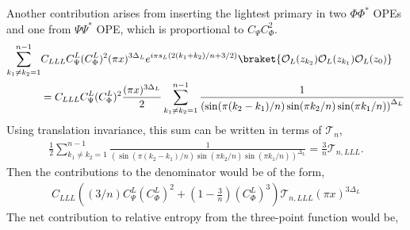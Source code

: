 \documentclass[11pt]{article}
\newcommand{\p}{\partial}
\newcommand{\mO}{\mathcal{O}}
\newcommand{\nn}{\nonumber}
\newcommand{\lb}{\left(}
\newcommand{\rb}{\right)}
\begin{document}
  Another contribution  arises from inserting the lightest primary in two $\Phi \Phi^*$ OPEs and one from $\Psi \Psi^*$ OPE, which is proportional to $C_\Psi C_\Phi^2$. 
    \begin{align}
       \sum_{k_1 \neq k_2 = 1}^{n-1}&C_{LLL}C_{\Psi}^L (C^L_{\Phi})^2(\pi x)^{3\Delta_L} e^{i\pi s_L(2(k_1 + k_2)/n + 3/2) }\braket{ \mO_L(z_{k_2})\mO_L(z_{k_1})\mO_L(z_{0})} \nn \\ 
       & = C_{LLL}C_{\Psi}^L (C^L_{\Phi})^2\frac{(\pi x)^{3\Delta_L}}{2}\sum_{k_1 \neq k_2 = 1}^{n-1}\frac{1}{\lb \sin(\pi (k_2 - k_1)/n) \sin (\pi k_2/n) \sin(\pi k_1/n)\rb^{\Delta_L}}
  \end{align}
Using translation invariance, this sum can be written in terms of $\mathcal{T}_n$,
\begin{align}
    \frac{1}{2}\sum_{k_1 \neq k_2 = 1}^{n-1}\frac{1}{\lb \sin(\pi (k_2 - k_1)/n) \sin (\pi k_2/n) \sin(\pi k_1/n)\rb^{\Delta_L}} = \frac{3}{n}\mathcal{T}_{n,LLL}.
\end{align}
Then the contributions to the denominator would be of the form,
\begin{align}
    C_{LLL}\lb  (3/n) C_{\Psi}^L (C^L_{\Phi})^2 + \lb 1-\frac{3}{n} \rb  (C^L_{\Phi})^3 \rb \mathcal{T}_{n,LLL} (\pi x)^{3\Delta_L}
\end{align}
The net contribution to relative entropy from the three-point function would be,
\end{document}
